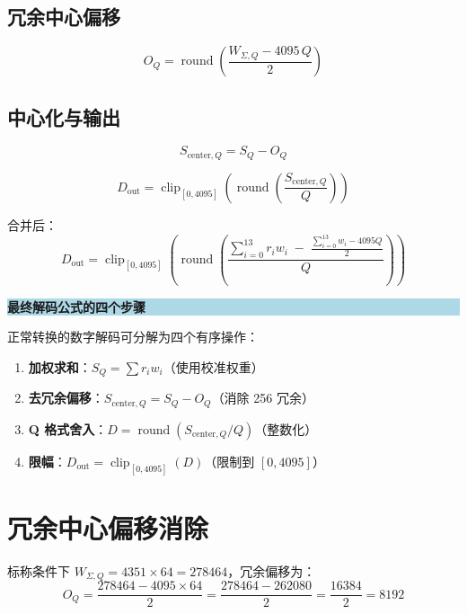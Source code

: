 \documentclass[
  UTF8,
  a4paper,
  11pt,
  oneside,
  fontset=fandol
]{ctexrep}
\newenvironment{keybox}[1]{%
  \begin{center}
  \begin{minipage}{0.94\textwidth}
  \colorbox{lightblue}{%
    \parbox{0.96\textwidth}{\textbf{#1}}}
  \vspace{0.35em}\par
}{%
  \end{minipage}
  \end{center}
}
\newcommand{\clip}{\operatorname{clip}}
\newcommand{\round}{\operatorname{round}}
\newcommand{\Dout}{D_{\mathrm{out}}}
\newcommand{\clipop}[1]{\clip_{[0,4095]}\!\left(#1\right)}
\newcommand{\roundop}[1]{\round\!\left(#1\right)}
\begin{document}
\section{冗余中心偏移}

\begin{equation}
\boxed{O_Q = \roundop{\frac{W_{\Sigma,Q} - 4095 \, Q}{2}}}
\label{eq:OQ}
\end{equation}

\section{中心化与输出}

\begin{equation}
S_{\mathrm{center},Q} = S_Q - O_Q
\end{equation}

\begin{equation}
\boxed{\Dout = \clipop{\roundop{\frac{S_{\mathrm{center},Q}}{Q}}}}
\label{eq:Dout}
\end{equation}

合并后：
\begin{equation}
\boxed{\Dout = \clipop{\roundop{\frac{\sum_{i=0}^{13} r_i w_i \;-\; \frac{\sum_{i=0}^{13} w_i - 4095Q}{2}}{Q}}}}
\label{eq:Dout_full}
\end{equation}

\begin{keybox}{最终解码公式的四个步骤}
正常转换的数字解码可分解为四个有序操作：
\begin{enumerate}[leftmargin=1.5em,itemsep=0pt]
    \item \textbf{加权求和}：$S_Q = \sum r_i w_i$（使用校准权重）
    \item \textbf{去冗余偏移}：$S_{\mathrm{center},Q} = S_Q - O_Q$（消除 \SI{256}{\LSB} 冗余）
    \item \textbf{Q 格式舍入}：$D = \roundop{S_{\mathrm{center},Q} / Q}$（整数化）
    \item \textbf{限幅}：$\Dout = \clipop{D}$（限制到 $[0, 4095]$）
\end{enumerate}
\end{keybox}

\chapter{冗余中心偏移消除}

标称条件下 $W_{\Sigma,Q} = 4351 \times 64 = 278464$，冗余偏移为：
\begin{equation}
O_Q = \frac{278464 - 4095 \times 64}{2} = \frac{278464 - 262080}{2} = \frac{16384}{2} = 8192
\end{equation}
\end{document}
